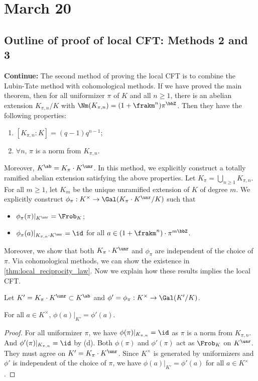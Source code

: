 \section{March 20}

\subsection{Outline of proof of local CFT: Methods 2 and 3}

  \textbf{Continue:}
  The second method of proving the local CFT is to combine the Lubin-Tate method with cohomological methods.
  If we have proved the main theorem, then for all uniformizer $\pi$ of $K$ and all $n\geq 1$, there is an abelian extension $K_{\pi,n}/K$ with $\Nm(K_{\pi,n}) = (1+\frakm^n)\pi^\bbZ$.
  Then they have the following properties:
  \begin{enumerate}
    \item $[K_{\pi,n}:K] = (q-1)q^{n-1}$;
    \item $\forall n$, $\pi$ is a norm from $K_{\pi,n}$.
  \end{enumerate}
  Moreover, $K^\ab = K_\pi \cdot K^\unr$.
  In this method, we explicitly construct a totally ramified abelian extension satisfying the above properties.
  Let $K_\pi = \bigcup_{n\geq 1} K_{\pi,n}$.
  For all $m \geq 1$, let $K_m$ be the unique unramified extension of $K$ of degree $m$.
  We explicitly construct $\phi_\pi: K^\times \to \Gal(K_\pi \cdot K^\unr/K)$ such that 
  \begin{itemize}
    \item[(c)] $\phi_\pi(\pi)|_{K^\unr} = \Frob_K$;
    \item[(d)] $\phi_\pi(a)|_{K_{\pi,n} \cdot K^\unr} = \id$ for all $a \in (1+\frakm^n) \cdot \pi^{m\bbZ}$.
  \end{itemize}
  Moreover, we show that both $K_\pi \cdot K^\unr$ and $\phi_\pi$ are independent of the choice of $\pi$.
  Via cohomological methods, we can show the existence in \cref{thm:local_reciprocity_law}.
  Now we explain how these results implies the local CFT.

  Let $K' = K_\pi \cdot K^\unr \subset K^\ab$ and $\phi' = \phi_\pi: K^\times \to \Gal(K'/K)$.

  \begin{lemma}
    For all $a \in K^\times$, $\phi(a)|_{K'} = \phi'(a)$.
  \end{lemma}
  \begin{proof}
    For all uniformizer $\pi$, we have $\phi(\pi)|_{K_{\pi,n}} = \id$ as $\pi$ is a norm from $K_{\pi,n}$.
    And $\phi'(\pi)|_{K_{\pi,n}} = \id$ by (d).
    Both $\phi(\pi)$ and $\phi'(\pi)$ act as $\Frob_K$ on $K^\unr$.
    They must agree on $K' = K_\pi \cdot K^\unr$.
    Since $K^\times$ is generated by uniformizers and $\phi'$ is independent of the choice of $\pi$, we have $\phi(a)|_{K'} = \phi'(a)$ for all $a \in K^\times$.
  \end{proof}

